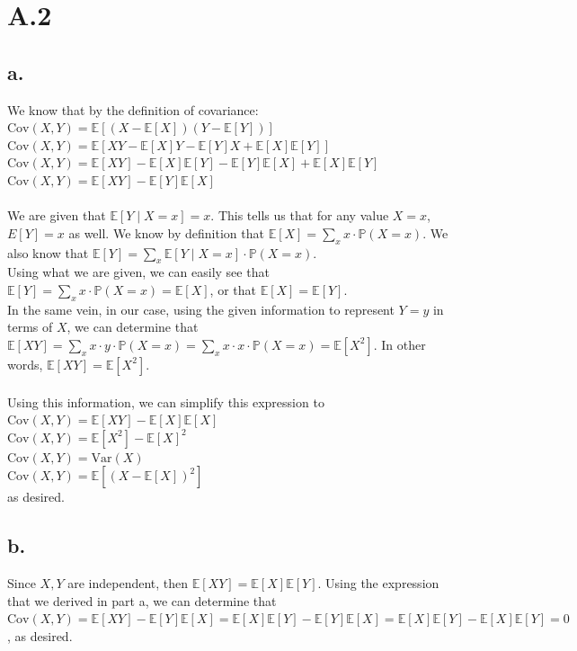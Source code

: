 \documentclass{article}
\newcommand{\1}{\mathbf{1}}
\newcommand{\E}{\mathbb{E}}
\renewcommand{\P}{\mathbb{P}}
\begin{document}
\section*{A.2}
{\Large

\subsection*{a.}
We know that by the definition of covariance: \\
$\text{Cov}(X,Y)=\E[(X-\E[X])(Y-\E[Y])]$ \\
$\text{Cov}(X,Y)=\E[XY - \E[X]Y - \E[Y]X + \E[X]\E[Y]]$ \\
$\text{Cov}(X,Y)=\E[XY] - \E[X]\E[Y] - \E[Y]\E[X] + \E[X]\E[Y]$ \\
$\text{Cov}(X,Y)=\E[XY] - \E[Y]\E[X]$ \\ \\
We are given that $\E[Y \mid X=x ] = x$. This tells us that for any value $X = x$, $E[Y] = x$ as well. We know by definition that $\E[X] = \sum_{x} x \cdot \P(X = x)$. We also know that $\E[Y] = \sum_{x} \E[Y \mid X = x] \cdot \P(X = x)$. \\
Using what we are given, we can easily see that $\E[Y] = \sum_{x} x \cdot \P(X = x) = \E[X]$, or that $\E[X] = \E[Y]$. \\
In the same vein, in our case, using the given information to represent $Y = y$ in terms of $X$, we can determine that $\E[XY] = \sum_x x \cdot y \cdot \P(X = x) = \sum_x x \cdot x \cdot \P(X = x) = \E[X^2]$. In other words, $\E[XY] = \E[X^2]$.\\ \\
Using this information, we can simplify this expression to \\
$\text{Cov}(X,Y)= \E[XY] - \E[X]\E[X]$ \\
$\text{Cov}(X,Y)= \E[X^2] - \E[X]^2$ \\
$\text{Cov}(X,Y)= \text{Var}(X)$ \\
$\text{Cov}(X,Y)= \E[(X - \E[X])^2]$ \\
as desired.

\subsection*{b.}
Since $X, Y$ are independent, then $\E[XY] = \E[X]\E[Y]$. Using the expression that we derived in part a, we can determine that $\text{Cov}(X,Y)=\E[XY] - \E[Y]\E[X] = \E[X]\E[Y] - \E[Y]\E[X] = \E[X]\E[Y] - \E[X]\E[Y] = 0$, as desired.

}
\end{document}
